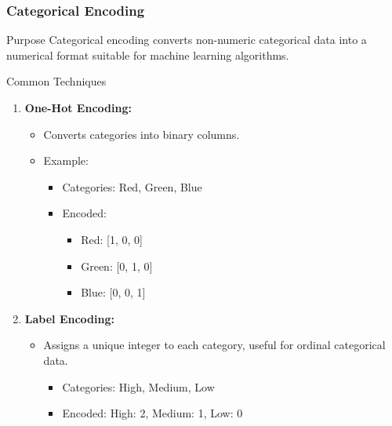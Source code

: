 \documentclass[aspectratio=169]{beamer}
\begin{document}
\begin{frame}[fragile]
    \frametitle{Categorical Encoding}
    \begin{block}{Purpose}
        Categorical encoding converts non-numeric categorical data into a numerical format suitable for machine learning algorithms.
    \end{block}

    \begin{block}{Common Techniques}
        \begin{enumerate}
            \item \textbf{One-Hot Encoding:}
            \begin{itemize}
                \item Converts categories into binary columns.
                \item Example: 
                \begin{itemize}
                    \item Categories: Red, Green, Blue
                    \item Encoded: 
                    \begin{itemize}
                        \item Red: [1, 0, 0]
                        \item Green: [0, 1, 0]
                        \item Blue: [0, 0, 1]
                    \end{itemize}
                \end{itemize}
            \end{itemize}
            \item \textbf{Label Encoding:}
            \begin{itemize}
                \item Assigns a unique integer to each category, useful for ordinal categorical data.
                \begin{itemize}
                    \item Categories: High, Medium, Low
                    \item Encoded: High: 2, Medium: 1, Low: 0
                \end{itemize}
            \end{itemize}
        \end{enumerate}
    \end{block}
\end{frame}
\end{document}
